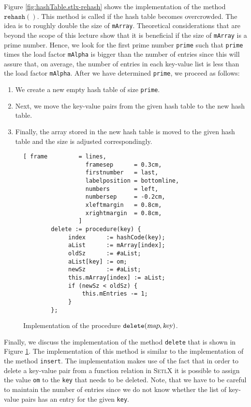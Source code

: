 Figure \ref{fig:hashTable.stlx-rehash} shows the implementation of the method
$\mathtt{rehash}()$.  This method is called if the hash table becomes overcrowded.  The idea is to
roughly double the size of \texttt{mArray}.  Theoretical considerations that are  beyond the scope
of this lecture show that it is beneficial if the size of \texttt{mArray} is a prime number.
Hence, we look for the first prime number \texttt{prime} such that \texttt{prime} times the load
factor \texttt{mAlpha} is bigger than the
number of entries since this will assure that, on average, the number of entries in each key-value
list is less than the load factor \texttt{mAlpha}.  After we have determined \texttt{prime}, we
proceed as follows: 
\begin{enumerate}
\item We create a new empty hash table of size \texttt{prime}.
\item Next, we move the key-value pairs from the given hash table to the new hash table.
\item Finally, the array stored in the new hash table is moved to the given hash table
      and the size is adjusted correspondingly.
\end{enumerate}





\begin{figure}[!ht]
\centering
\begin{Verbatim}[ frame         = lines, 
                  framesep      = 0.3cm, 
                  firstnumber   = last,
                  labelposition = bottomline,
                  numbers       = left,
                  numbersep     = -0.2cm,
                  xleftmargin   = 0.8cm,
                  xrightmargin  = 0.8cm,
                ]
        delete := procedure(key) {
             index      := hashCode(key);
             aList      := mArray[index];
             oldSz      := #aList;
             aList[key] := om;
             newSz      := #aList;
             this.mArray[index] := aList;
             if (newSz < oldSz) {
                 this.mEntries -= 1;
             }    
        };
\end{Verbatim}
\vspace*{-0.3cm}
\caption{Implementation of the procedure $\mathtt{delete}(\textsl{map}, \textsl{key})$.}
\label{fig:hashTable.stlx-delete}
\end{figure}

Finally, we discuss the implementation of the method \texttt{delete} that is shown in Figure
\ref{fig:hashTable.stlx-delete}.  The implementation of this method is similar to the implementation
of the method \texttt{insert}.   The implementation makes use of the fact that in order to delete
a key-value pair from a function relation in \textsc{SetlX} it is possible to assign the value
\texttt{om} to the \texttt{key} that needs to be deleted. Note, that we have to be careful to
maintain the number of entries since we do not know whether the list of key-value pairs has an entry
for the given \texttt{key}.

